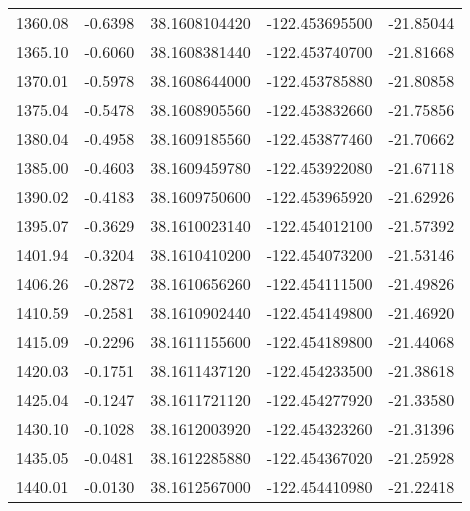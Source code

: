 \begin{longtable}{p{2.5cm}p{2.5cm}p{3cm}p{3cm}p{2.5cm}}
      1360.08  & 	-0.6398 &               38.1608104420  &   -122.453695500   &	-21.85044 \\
      1365.10  & 	-0.6060 &               38.1608381440  &   -122.453740700   &	-21.81668 \\
      1370.01  & 	-0.5978 &               38.1608644000  &   -122.453785880   &	-21.80858 \\
      1375.04  & 	-0.5478 &               38.1608905560  &   -122.453832660   &	-21.75856 \\
      1380.04  & 	-0.4958 &               38.1609185560  &   -122.453877460   &	-21.70662 \\
      1385.00  & 	-0.4603 &               38.1609459780  &   -122.453922080   &	-21.67118 \\
      1390.02  & 	-0.4183 &               38.1609750600  &   -122.453965920   &	-21.62926 \\
      1395.07  & 	-0.3629 &               38.1610023140  &   -122.454012100   &	-21.57392 \\
      1401.94  & 	-0.3204 &               38.1610410200  &   -122.454073200   &	-21.53146 \\
      1406.26  & 	-0.2872 &               38.1610656260  &   -122.454111500   &	-21.49826 \\
      1410.59  & 	-0.2581 &               38.1610902440  &   -122.454149800   &	-21.46920 \\
      1415.09  & 	-0.2296 &               38.1611155600  &   -122.454189800   &	-21.44068 \\
      1420.03  & 	-0.1751 &               38.1611437120  &   -122.454233500   &	-21.38618 \\
      1425.04  & 	-0.1247 &               38.1611721120  &   -122.454277920   &	-21.33580 \\
      1430.10  & 	-0.1028 &               38.1612003920  &   -122.454323260   &	-21.31396 \\
      1435.05  & 	-0.0481 &               38.1612285880  &   -122.454367020   &	-21.25928 \\
      1440.01  & 	-0.0130 &               38.1612567000  &   -122.454410980   &	-21.22418 \\ \bottomrule
 	
\end{longtable}
